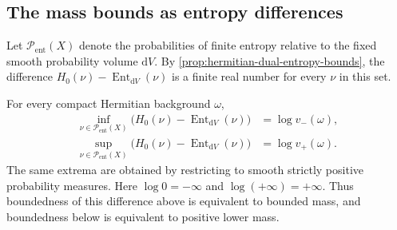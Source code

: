 \subsection{The mass bounds as entropy differences}

Let $\mathcal P_{\mathrm{ent}}(X)$ denote the probabilities of finite entropy relative to the fixed smooth probability volume $\mathrm{d}V$. By \cref{prop:hermitian-dual-entropy-bounds}, the difference $H_0(\nu)-\operatorname{Ent}_{\mathrm{d}V}(\nu)$ is a finite real number for every $\nu$ in this set.

\begin{proposition}\label{prop:entropy-mass-extrema}
For every compact Hermitian background $\omega$,
\[
 \begin{split}
 \inf_{\nu\in\mathcal P_{\mathrm{ent}}(X)}
      \bigl(H_0(\nu)-\operatorname{Ent}_{\mathrm{d}V}(\nu)\bigr)
       &=\log v_-(\omega),\\
 \sup_{\nu\in\mathcal P_{\mathrm{ent}}(X)}
      \bigl(H_0(\nu)-\operatorname{Ent}_{\mathrm{d}V}(\nu)\bigr)
       &=\log v_+(\omega).
 \end{split}
\]
The same extrema are obtained by restricting to smooth strictly positive probability measures. Here $\log0=-\infty$ and $\log(+\infty)=+\infty$. Thus boundedness of this difference above is equivalent to bounded mass, and boundedness below is equivalent to positive lower mass.
\end{proposition}
